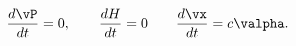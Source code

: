 \begin{equation}
\frac{d\vP}{dt}=0,
\qquad
\frac{dH}{dt}=0
\qquad
\frac{d\vx}{dt}=c\valpha.
\label{Heq}
\end{equation}

